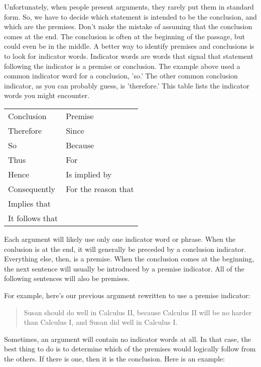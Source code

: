 Unfortunately, when people present arguments, they rarely put them in standard form. So, we have to decide which statement is intended to be the conclusion, and which are the premises. Don't make the mistake of assuming that the conclusion comes at the end. The conclusion is often at the beginning of the passage, but could even be in the middle. A better way to identify premises and conclusions is to look for indicator words. Indicator words are words that signal that statement following the indicator is a premise or conclusion. The example above used a common indicator word for a conclusion, 'so.' The other common conclusion indicator, as you can probably guess, is 'therefore.' This table lists the indicator words you might encounter.

\begin{table}[]
\begin{tabular}{@{}ll@{}}
Conclusion      & Premise             \\
Therefore       & Since               \\
So              & Because             \\
Thus            & For                 \\
Hence           & Is implied by       \\
Consequently    & For the reason that \\
Implies that    &                     \\
It follows that &                    
\end{tabular}
\end{table}

Each argument will likely use only one indicator word or phrase. When the conlusion is at the end, it will generally be preceded by a conclusion indicator. Everything else, then, is a premise. When the conclusion comes at the beginning, the next sentence will usually be introduced by a premise indicator. All of the following sentences will also be premises.

For example, here's our previous argument rewritten to use a premise indicator:

\begin{quote}
Susan should do well in Calculus II, because Calculus II will be no harder than Calculus I, and Susan did well in Calculus I.
\end{quote}

Sometimes, an argument will contain no indicator words at all. In that case, the best thing to do is to determine which of the premises would logically follow from the others. If there is one, then it is the conclusion. Here is an example:

